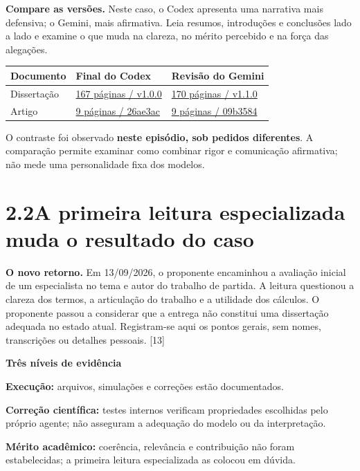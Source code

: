 \documentclass[11pt,a4paper]{article}
\newcommand{\fonte}[1]{{\small\color{navy}[#1]}}
\newcommand{\titulo}[2]{\section*{\color{navy}#1\quad #2}}
\begin{document}
\textbf{Compare as versões.} Neste caso, o Codex apresenta uma narrativa mais defensiva; o Gemini, mais afirmativa. Leia resumos, introduções e conclusões lado a lado e examine o que muda na clareza, no mérito percebido e na força das alegações.

\begin{tabularx}{\textwidth}{@{}p{3cm}Y Y@{}}
\toprule
\textbf{Documento} & \textbf{Final do Codex} & \textbf{Revisão do Gemini}\\
\midrule
Dissertação & \href{https://github.com/flavioluiz/TGdoWayne/blob/39dd682ce49fb513cb06c65cb6515fb1c64effb4/output/pdf/v1.0.0/dissertacao.pdf}{167 páginas / v1.0.0} & \href{https://github.com/flavioluiz/TGdoWayne/blob/09b3584b5eea40251f84fb594da9551cba2b925d/output/pdf/v1.1.0/dissertacao.pdf}{170 páginas / v1.1.0}\\
Artigo & \href{https://github.com/flavioluiz/TGdoWayne/blob/26ae3acd6016fcff9f8505980c90b3f908b2beb2/article/manuscript.pdf}{9 páginas / 26ae3ac} & \href{https://github.com/flavioluiz/TGdoWayne/blob/09b3584b5eea40251f84fb594da9551cba2b925d/article/manuscript.pdf}{9 páginas / 09b3584}\\
\bottomrule
\end{tabularx}

O contraste foi observado \textbf{neste episódio, sob pedidos diferentes}. A comparação permite examinar como combinar rigor e comunicação afirmativa; não mede uma personalidade fixa dos modelos.
\newpage


\titulo{2.2}{A primeira leitura especializada muda o resultado do caso}
\textbf{O novo retorno.} Em 13/09/2026, o proponente encaminhou a avaliação inicial de um especialista no tema e autor do trabalho de partida. A leitura questionou a clareza dos termos, a articulação do trabalho e a utilidade dos cálculos. O proponente passou a considerar que a entrega não constitui uma dissertação adequada no estado atual. Registram-se aqui os pontos gerais, sem nomes, transcrições ou detalhes pessoais. \fonte{13}

\begin{destaque}
\textbf{Três níveis de evidência}\par
\textbf{Execução:} arquivos, simulações e correções estão documentados.\par
\textbf{Correção científica:} testes internos verificam propriedades escolhidas pelo próprio agente; não asseguram a adequação do modelo ou da interpretação.\par
\textbf{Mérito acadêmico:} coerência, relevância e contribuição não foram estabelecidas; a primeira leitura especializada as colocou em dúvida.
\end{destaque}
\end{document}
